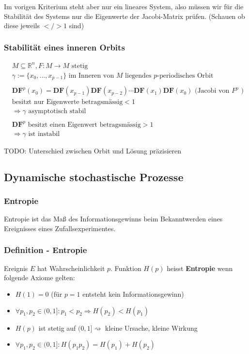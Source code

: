 \documentclass[a4paper]{article}
\newcommand{\R}{\mathbb{R}}
\begin{document}
Im vorigen Kriterium steht aber nur ein lineares System, also müssen
wir für die Stabilität des Systems nur die Eigenwerte der Jacobi-Matrix
prüfen. (Schauen ob diese jeweils $</> 1$ sind)

\subsubsection{Stabilität eines inneren Orbits }

\begin{align*}
	& M \subseteq \R ^{n}, F: M \rightarrow M \text{ stetig } \\
	& \gamma := \{
		x_0, ..., x_{p-1}
	\} \text{ im Inneren von $M$ liegendes $p$-periodisches Orbit } \\
	& \\
	& \textbf{DF}^{p} (x_0) =
	\textbf{DF} (x_{p-1})
	\textbf{DF} (x_{p-2})
	\cdots
	\textbf{DF} (x_1)
	\textbf{DF} (x_0) \text{ (Jacobi von $F ^{p}$ ) }
	\\
	& \text{besitzt nur Eigenwerte betragsmässig} < 1 \\
	&\Rightarrow \gamma \text{ asymptotisch stabil } \\
	& \\
	& \textbf{DF}^{p} \text{ besitzt einen Eigenwert betragsmässig}>1  \\
	&\Rightarrow \gamma \text{ ist instabil }
\end{align*}

TODO: Unterschied zwischen Orbit und Lösung präzisieren

\subsection{Dynamische stochastische Prozesse}

\subsubsection{Entropie}
Entropie ist das Maß des Informationsgewinns beim Bekanntwerden eines
Ereignisses eines Zufallsexperimentes.

\subsubsection*{Definition - Entropie}
Ereignis $E$ hat Wahrscheinlichkeit $p$. Funktion $H(p)$ heisst \textbf{Entropie}
wenn folgende Axiome gelten:

\begin{itemize}
	\item $H(1) = 0$ (für $p = 1$ entsteht kein Informationsgewinn)
	\item $\forall p_1, p_2 \in (0, 1]: p_1 < p_2 \Rightarrow H(p_2) < H(p_1)$
	\item $H(p)$ ist stetig auf $(0, 1] \rightsquigarrow$ 
		kleine Ursache, kleine Wirkung
	\item $\forall p_1, p_2 \in (0, 1]: H(p_1 p_2) = H(p_1) + H(p_2)$
\end{itemize}
\end{document}
